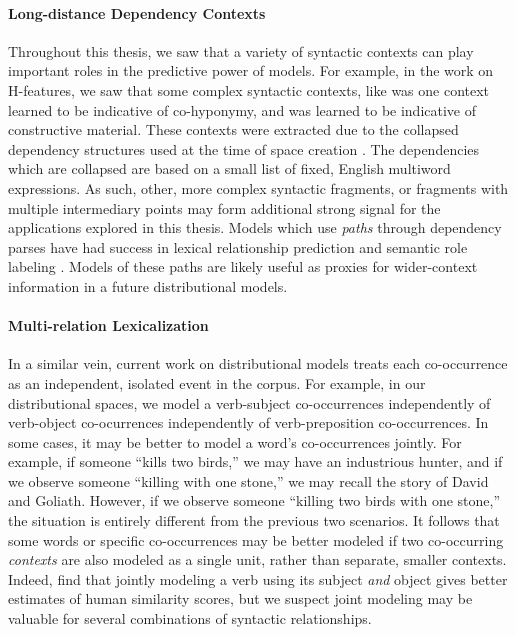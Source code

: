 \paragraph{Long-distance Dependency Contexts}
Throughout this thesis, we saw that a variety of syntactic contexts can play
important roles in the predictive power of models. For example, in the work on
H-features, we saw that some complex syntactic contexts, like
 was one context learned to be indicative of
co-hyponymy, and  was learned to be indicative
of constructive material. These contexts were extracted due to the collapsed
dependency structures used at the time of space creation
\cite{marneffe:2008:techreport}. The dependencies which are collapsed are
based on a small list of fixed, English multiword expressions. As such,
other, more complex syntactic fragments, or fragments with multiple
intermediary points may form additional strong signal for the applications
explored in this thesis. Models which use {\em paths} through dependency
parses have had success in lexical relationship prediction
\cite{shwartz:2016:acl,shwartz:2016:cogalex2} and semantic role labeling
\cite{roth:2016:acl}. Models of these paths are likely useful as proxies for
wider-context information in a future distributional models.

\paragraph{Multi-relation Lexicalization}
In a similar vein, current work on distributional models treats each
co-occurrence as an independent, isolated event in the corpus. For example, in
our distributional spaces, we model a verb-subject co-occurrences independently
of verb-object co-ocurrences independently of verb-preposition co-occurrences.
In some cases, it may be better to model a word's co-occurrences jointly. For
example, if someone ``kills two birds,'' we may have an industrious hunter, and
if we observe someone ``killing with one stone,'' we may recall the story of
David and Goliath. However, if we observe someone ``killing two birds with one
stone,'' the situation is entirely different from the previous two scenarios.
It follows that some words or specific co-occurrences may be better modeled
if two co-occurring {\em contexts} are also modeled as a single unit, rather
than separate, smaller contexts.
Indeed,  find that jointly modeling a verb using
its subject {\em and} object gives better estimates of human similarity
scores, but we suspect joint modeling may be valuable for several combinations
of syntactic relationships.

